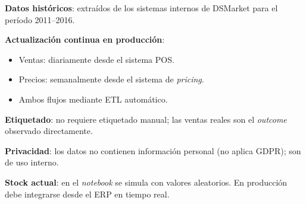 \documentclass[12pt, a4paper, oneside]{report}
\begin{document}
\begin{tcolorbox}[canvasbox, title={6.\ Data Collection}]
\begin{minipage}[t]{0.45\textwidth}
\textbf{Datos hist\'oricos}: extra\'idos de los sistemas internos de DSMarket para el per\'iodo 2011--2016.

\medskip
\textbf{Actualizaci\'on continua en producci\'on}:
\begin{itemize}[noitemsep, leftmargin=*]
  \item Ventas: diariamente desde el sistema POS.
  \item Precios: semanalmente desde el sistema de \textit{pricing}.
  \item Ambos flujos mediante ETL autom\'atico.
\end{itemize}
\end{minipage}
\hfill
\begin{minipage}[t]{0.50\textwidth}
\textbf{Etiquetado}: no requiere etiquetado manual; las ventas reales son el \textit{outcome} observado directamente.

\medskip
\textbf{Privacidad}: los datos no contienen informaci\'on personal (no aplica GDPR); son de uso interno.

\medskip
\textbf{Stock actual}: en el \textit{notebook} se simula con valores aleatorios. En producci\'on debe integrarse desde el ERP en tiempo real.
\end{minipage}
\end{tcolorbox}

\vspace{0.4cm}
\end{document}
